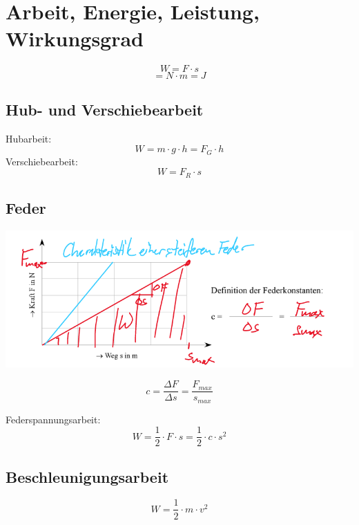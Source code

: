 \documentclass[a4paper]{article}
\begin{document}
  \section{Arbeit, Energie, Leistung, Wirkungsgrad}
  \begin{equation}
    W = F \cdot s
  \end{equation}
  \begin{equation}
    [W] = N \cdot m = J
  \end{equation}

  \subsection{Hub- und Verschiebearbeit}
  Hubarbeit:
  \begin{equation}
    W = m \cdot g \cdot h = F_G \cdot h
  \end{equation}
  Verschiebearbeit:
  \begin{equation}
    W = F_R \cdot s
  \end{equation}

  \subsection{Feder}
  \includegraphics[width=\textwidth]{images/spring.png}

  \begin{equation}
    c = \frac{\Delta F}{\Delta s} = \frac{F_{max}}{s_{max}}
  \end{equation}
  
  Federspannungsarbeit:
  \begin{equation}
    W = \frac{1}{2} \cdot F \cdot s = \frac{1}{2} \cdot c \cdot s^2
  \end{equation}
  
  \subsection{Beschleunigungsarbeit}
  \begin{equation}
    W = \frac{1}{2} \cdot m \cdot v^2
  \end{equation}
\end{document}
